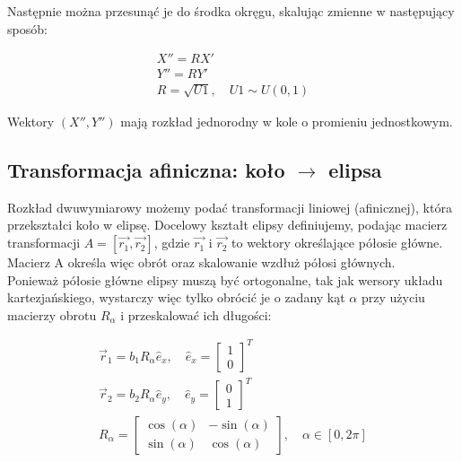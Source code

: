 \documentclass[a4paper,12pt,twoside]{article}
\begin{document}
 Następnie można przesunąć je do środka okręgu, skalując zmienne w następujący sposób:

 \begin{equation}
    \begin{gathered}
    X'' = RX' \\
    Y'' = RY' \\
    R = \sqrt{U1}, \quad U1 \sim U(0,1)
    \end{gathered} \tag{3} \label{eq:3}
\end{equation}

Wektory $(X'', Y'')$ mają rozkład jednorodny w kole o promieniu jednostkowym.

\subsection{Transformacja afiniczna: koło $\rightarrow$ elipsa}

Rozkład dwuwymiarowy możemy podać transformacji liniowej (afinicznej), która przekształci koło w elipsę. Docelowy kształt elipsy definiujemy, podając macierz transformacji $A = [\vec{r_1}, \vec{r_2}]$, gdzie $\vec{r_1}$ i $\vec{r_2}$ to wektory określające półosie główne. \\
Macierz A określa więc obrót oraz skalowanie wzdłuż półosi głównych. \\

 Ponieważ półosie główne elipsy muszą być ortogonalne, tak jak wersory układu kartezjańskiego, wystarczy więc tylko obrócić je o zadany kąt $\alpha$ przy użyciu macierzy obrotu $R_{\alpha}$ i przeskalować ich długości:


\begin{equation}
    \begin{gathered}
        \vec{r}_1 = b_1 R_{\alpha} \hat{e}_x, \quad \hat{e}_x = \begin{bmatrix} 1 \\ 0 \end{bmatrix}^T \\
        \vec{r}_2 = b_2 R_{\alpha} \hat{e}_y, \quad \hat{e}_y = \begin{bmatrix} 0 \\ 1 \end{bmatrix}^T \\
        R_{\alpha} =
        \begin{bmatrix}
            \cos(\alpha) & -\sin(\alpha) \\
            \sin(\alpha) & \cos(\alpha)
        \end{bmatrix}, \quad \alpha \in [0, 2\pi]
    \end{gathered} \tag{4} \label{eq:4}
\end{equation}
\end{document}
